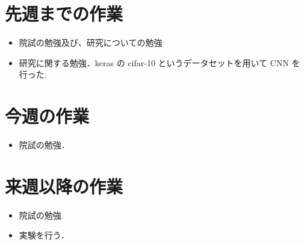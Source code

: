 \section{先週までの作業}
\begin{itemize}
\item 院試の勉強及び、研究についての勉強
\item 研究に関する勉強．keras の cifar-10 というデータセットを用いて CNN を行った.
\end{itemize}

\section{今週の作業}
\begin{itemize}
\item 院試の勉強．
\end{itemize}

\section{来週以降の作業}
\begin{itemize}
\item 院試の勉強.
  \item  実験を行う．
\end{itemize}

